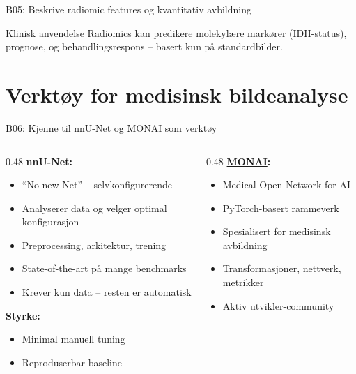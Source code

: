 \documentclass[aspectratio=169, 10pt]{beamer}
\begin{document}
\begin{frame}{B05: Beskrive radiomic features og kvantitativ avbildning}
    \vspace{0.3cm}
    \begin{block}{Klinisk anvendelse}
        Radiomics kan predikere molekylære markører (IDH-status), prognose, og behandlingsrespons -- basert kun på standardbilder.
    \end{block}
\end{frame}

\section{Verktøy for medisinsk bildeanalyse}

\begin{frame}{B06: Kjenne til nnU-Net og MONAI som verktøy}
    \begin{columns}[T]
        \begin{column}{0.48\textwidth}
            \textbf{nnU-Net:}
            \begin{itemize}
                \item ``No-new-Net'' -- selvkonfigurerende
                \item Analyserer data og velger optimal konfigurasjon
                \item Preprocessing, arkitektur, trening
                \item State-of-the-art på mange benchmarks
                \item Krever kun data -- resten er automatisk
            \end{itemize}
            
            \vspace{0.3cm}
            \textbf{Styrke:}
            \begin{itemize}
                \item Minimal manuell tuning
                \item Reproduserbar baseline
            \end{itemize}
        \end{column}
        \begin{column}{0.48\textwidth}
            \textbf{\href{https://monai.io/}{MONAI}:}
            \begin{itemize}
                \item Medical Open Network for AI
                \item PyTorch-basert rammeverk
                \item Spesialisert for medisinsk avbildning
                \item Transformasjoner, nettverk, metrikker
                \item Aktiv utvikler-community
            \end{itemize}
            

\end{column}
\end{columns}
\end{frame}
\end{document}
